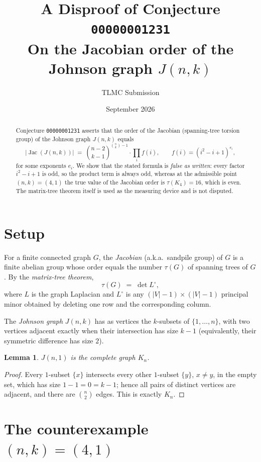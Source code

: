 \documentclass[11pt]{article}
\title{A Disproof of Conjecture \texttt{00000001231}\\
\large On the Jacobian order of the Johnson graph $J(n,k)$}
\author{TLMC Submission}
\date{September 2026}
\newtheorem{lemma}{Lemma}
\theoremstyle{definition}
\begin{document}
\maketitle

\begin{abstract}
Conjecture \texttt{00000001231} asserts that the order of the Jacobian (spanning-tree
torsion group) of the Johnson graph $J(n,k)$ equals
\[
|\operatorname{Jac}(J(n,k))| \;=\; \binom{n-2}{k-1}^{\binom{n}{k}-1}\cdot \prod_i f(i),
\qquad f(i) = (i^2-i+1)^{e_i},
\]
for some exponents $e_i$. We show that the stated formula is \emph{false as written}:
every factor $i^2-i+1$ is odd, so the product term is always odd, whereas at the
admissible point $(n,k)=(4,1)$ the true value of the Jacobian order is
$\tau(K_4)=16$, which is even. The matrix-tree theorem itself is used as the measuring
device and is not disputed.
\end{abstract}

\section{Setup}

For a finite connected graph $G$, the \emph{Jacobian} (a.k.a.\ sandpile group) of $G$
is a finite abelian group whose order equals the number $\tau(G)$ of spanning trees of
$G$. By the \emph{matrix-tree theorem},
\begin{equation}\label{eq:mtt}
\tau(G) \;=\; \det L^{\circ},
\end{equation}
where $L$ is the graph Laplacian and $L^{\circ}$ is any $(|V|-1)\times(|V|-1)$ principal
minor obtained by deleting one row and the corresponding column.

The \emph{Johnson graph} $J(n,k)$ has as vertices the $k$-subsets of $\{1,\dots,n\}$,
with two vertices adjacent exactly when their intersection has size $k-1$ (equivalently,
their symmetric difference has size $2$).

\begin{lemma}\label{lem:Jn1}
$J(n,1)$ is the complete graph $K_n$.
\end{lemma}
\begin{proof}
Every $1$-subset $\{x\}$ intersects every other $1$-subset $\{y\}$, $x \neq y$, in the
empty set, which has size $1-1=0=k-1$; hence all pairs of distinct vertices are
adjacent, and there are $\binom{n}{2}$ edges. This is exactly $K_n$.
\end{proof}

\section{The counterexample $(n,k)=(4,1)$}
\end{document}
